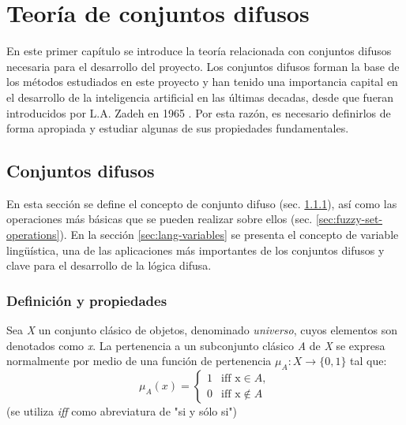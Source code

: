 \chapter{Teoría de conjuntos difusos}
\label{cha:teoria-conjuntos-difusos}

En este primer capítulo se introduce la teoría relacionada con conjuntos difusos necesaria para el desarrollo del proyecto. Los conjuntos difusos forman la base de los métodos estudiados en este proyecto y han tenido una importancia capital en el desarrollo de la inteligencia artificial en las últimas decadas, desde que fueran introducidos por L.A. Zadeh en 1965 \cite{Zadeh65}. Por esta razón, es necesario definirlos de forma apropiada y estudiar algunas de sus propiedades fundamentales.

\section{Conjuntos difusos}

En esta sección se define el concepto de conjunto difuso (sec. \ref{sec:fuzzy-set-definition-and-properties}), así como las operaciones más básicas que se pueden realizar sobre ellos (sec. \ref{sec:fuzzy-set-operations}). En la sección \ref{sec:lang-variables} se presenta el concepto de variable lingüística, una de las aplicaciones más importantes de los conjuntos difusos y clave para el desarrollo de la lógica difusa.

\subsection{Definición y propiedades}
\label{sec:fuzzy-set-definition-and-properties}
\begin{definition}
Sea \emph{X} un conjunto clásico de objetos, denominado \emph{universo}, cuyos elementos son denotados como \emph{x}. La pertenencia a un subconjunto clásico \emph{A} de \emph{X} se expresa normalmente por medio de una función de pertenencia $\mu_{A}:X\rightarrow\{0,1\}$ tal que:
\begin{equation}
\mu_{A}(x)=\begin{cases} 1 & \mbox{iff } \mbox{x}\in A, \\ 0 & \mbox{iff } \mbox{x}\notin A \end{cases}
\end{equation}
(se utiliza \emph{iff} como abreviatura de "si y sólo si")
\end{definition}

